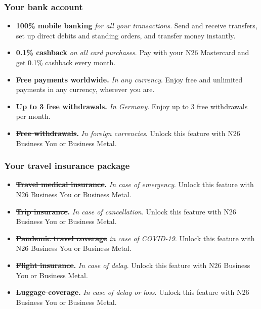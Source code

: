 \documentclass[onsided]{book}
\numberwithin{equation}{section}
\begin{document}
\subsubsection{Your bank account}
\begin{itemize}
    \item \textbf{100\% mobile banking} \textit{for all your transactions}. Send and receive transfers, set up direct debits and standing orders, and transfer money instantly.
    \item \textbf{0.1\% cashback} \textit{on all card purchases}. Pay with your N26 Mastercard and get 0.1\% cashback every month.
    \item \textbf{Free payments worldwide.} \textit{In any currency}. Enjoy free and unlimited payments in any currency, wherever you are.
    \item \textbf{Up to 3 free withdrawals.} \textit{In Germany}. Enjoy up to 3 free withdrawals per month.
    \item \textbf{\st{Free withdrawals}.} \textit{In foreign currencies}. Unlock this feature with N26 Business You or Business Metal.
\end{itemize}

\subsubsection{Your travel insurance package}
\begin{itemize}
    \item \textbf{\st{Travel medical insurance}.} \textit{In case of emergency}. Unlock this feature with N26 Business You or Business Metal.
    \item \textbf{\st{Trip insurance}.} \textit{In case of cancellation}. Unlock this feature with N26 Business You or Business Metal.
    \item \textbf{\st{Pandemic travel coverage}} \textit{in case of COVID-19}. Unlock this feature with N26 Business You or Business Metal.
    \item \textbf{\st{Flight insurance}.} \textit{In case of delay}. Unlock this feature with N26 Business You or Business Metal.
    \item \textbf{\st{Luggage coverage}.} \textit{In case of delay or loss}. Unlock this feature with N26 Business You or Business Metal.
\end{itemize}
\end{document}

